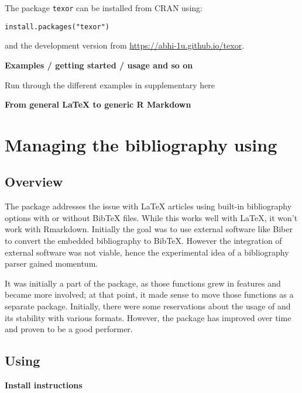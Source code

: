 The package \texttt{texor} can be installed from CRAN using:

\begin{verbatim}
install.packages("texor")
\end{verbatim}

and the development version from \url{https://abhi-1u.github.io/texor}.

\textbf{Examples / getting started / usage and so on}

Run through the different examples in supplementary here

\textbf{From general LaTeX to generic R Markdown}

\hypertarget{managing-the-bibliography-using}{%
\section{\texorpdfstring{Managing the bibliography using }{Managing the bibliography using }}\label{managing-the-bibliography-using}}

\hypertarget{overview}{%
\subsection{Overview}\label{overview}}

The  package addresses the issue with LaTeX articles using built-in bibliography options with or without BibTeX files. While this works well with LaTeX, it won't work with Rmarkdown. Initially the goal was to use external software like Biber to convert the embedded bibliography to BibTeX.
However the integration of external software was not viable, hence the experimental idea of a bibliography parser gained momentum.

It was initially a part of the  package, as those functions grew in features and became more involved; at that point, it made sense to move those functions as a separate package. Initially, there were some reservations about
the usage of  and its stability with various formats. However, the package has improved over time and proven to be a good performer.

\hypertarget{using-1}{%
\subsection{\texorpdfstring{Using }{Using }}\label{using-1}}

\textbf{Install instructions}

